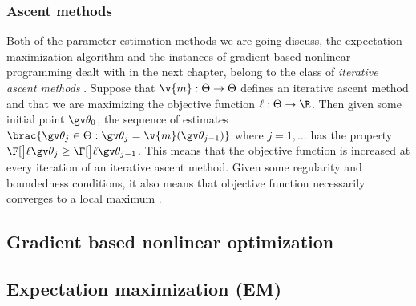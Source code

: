 \subsubsection{Ascent methods}

Both of the parameter estimation methods we are going
discuss, the expectation maximization algorithm and
the instances of gradient based nonlinear programming dealt with in the
next chapter, belong to the class of \emph{iterative ascent methods} \parencite{luenberger2008}.
Suppose that $\v{m}:\Theta \to \Theta$ defines an iterative ascent method
and that we are maximizing the objective function $\ell:\Theta\to\R$.
Then given some initial point $\Th_0$, the sequence of estimates
$\brac{\Th_j \in \Theta: \Th_j=\v{m}(\Th_{j-1})}$ where $j=1,\dots$
has the property $\lLH[\Th_{j}]\geq \lLH[\Th_{j-1}]$. This means
that the objective function is increased at every iteration of
an iterative ascent method. Given some regularity and boundedness conditions,
it also means that objective function necessarily converges to a local maximum
\parencite{Cappe2005,luenberger2008}.


\subsection{Gradient based nonlinear optimization}\label{sec:grad}%

\clearpage
\subsection{Expectation maximization (EM)}\label{sec:em}%


% 



